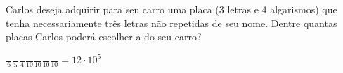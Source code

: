 \begin{ex}
 Carlos deseja adquirir para seu carro uma placa (3 letras e 4 algarismos) que tenha necessariamente três letras não repetidas de seu nome. Dentre quantas placas Carlos poderá escolher a do seu carro?
  \begin{sol}
  $\frac{\phantom{A}}{6}\frac{\phantom{A}}{5}\frac{\phantom{A}}{4}\frac{\phantom{A}}{10}\frac{\phantom{A}}{10}\frac{\phantom{A}}{10}\frac{\phantom{A}}{10}= 12 \cdot {10^5}$
  \end{sol}
\end{ex}
